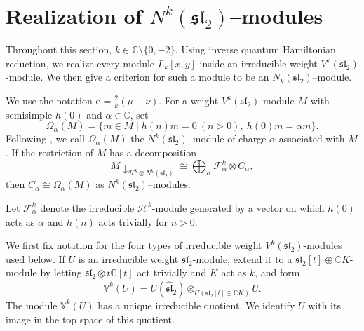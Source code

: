 \documentclass[11 pt]{amsart}
\theoremstyle{definition}
\theoremstyle{plain}
\begin{document}
\section{Realization of
$N^k(\mathfrak{sl}_2)$--modules}
\label{sec:realization-simple-quotients}
Throughout this section, $k\in\mathbb C\setminus\{0,-2\}$.
Using inverse quantum Hamiltonian reduction, we realize every module
$L_k[x,y]$ inside an irreducible weight
$V^k(\mathfrak{sl}_2)$-module. We then give a criterion for such a
module to be an $N_k(\mathfrak{sl}_2)$--module.

\vskip 5mm

We use the notation $\mathbf c=\frac{2}{k}(\mu-\nu)$.
For a weight $V^k(\mathfrak{sl}_2)$-module $M$ with semisimple $h(0)$ and
$\alpha\in\mathbb C$, set
\[
  \Omega_\alpha(M)=
  \{m\in M\mid h(n)m=0\ (n>0),\ h(0)m=\alpha m\}.
\]
Following \cite{ACR,ALY}, we call $\Omega_\alpha(M)$ the
$N^k(\mathfrak{sl}_2)$--module of charge $\alpha$ associated with $M$.
If the restriction of $M$ has a decomposition
\[
M\downarrow_{\mathcal H^k\otimes N^k(\mathfrak{sl}_2)}
\cong\bigoplus_{\alpha}
\mathcal F^k_\alpha\otimes C_\alpha,
\]
then $C_\alpha\cong\Omega_\alpha(M)$ as
$N^k(\mathfrak{sl}_2)$--modules.

Let $\mathcal F^k_\alpha$ denote the irreducible
$\mathcal H^k$-module generated by a vector on which $h(0)$ acts as
$\alpha$ and $h(n)$ acts trivially for $n>0$.

We first fix notation for the four types of irreducible weight
$V^k(\mathfrak{sl}_2)$-modules used below. If $U$ is an irreducible weight
$\mathfrak{sl}_2$-module, extend it to a
$\mathfrak{sl}_2[t]\oplus\mathbb CK$-module by letting
$\mathfrak{sl}_2\otimes t\mathbb C[t]$ act trivially and $K$ act as $k$, and
form
\[
  \mathbb V^k(U)=
  U(\widehat{\mathfrak{sl}}_2)
  \otimes_{U(\mathfrak{sl}_2[t]\oplus\mathbb CK)}U.
\]
The module $\mathbb V^k(U)$ has a unique irreducible quotient. We
identify $U$ with its image in the top space of this quotient.
\end{document}

